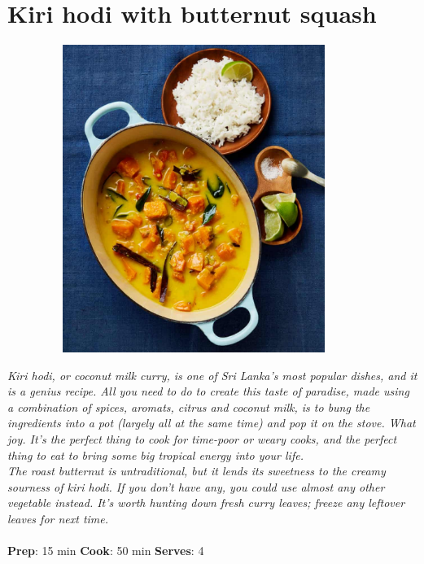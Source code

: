 \documentclass{book}
\begin{document}
\section{Kiri hodi with butternut squash}
\begin{figure}
\centering\includegraphics[width=10cm,height=10cm,keepaspectratio]{Recipe_Pictures/Kiri_hodi_with_butternut_squash.png}
\end{figure}
\emph{ Kiri hodi, or coconut milk curry, is one of Sri Lanka’s most popular dishes, and it is a genius recipe. All you need to do to create this taste of paradise, made using a combination of spices, aromats, citrus and coconut milk, is to bung the ingredients into a pot (largely all at the same time) and pop it on the stove. What joy. It’s the perfect thing to cook for time-poor or weary cooks, and the perfect thing to eat to bring some big tropical energy into your life.\\ 
The roast butternut is untraditional, but it lends its sweetness to the creamy sourness of kiri hodi. If you don’t have any, you could use almost any other vegetable instead. It’s worth hunting down fresh curry leaves; freeze any leftover leaves for next time.}\\\\ 
\textbf{Prep}: 15 min
\textbf{Cook}: 50 min
\textbf{Serves}: 4
\end{document}
